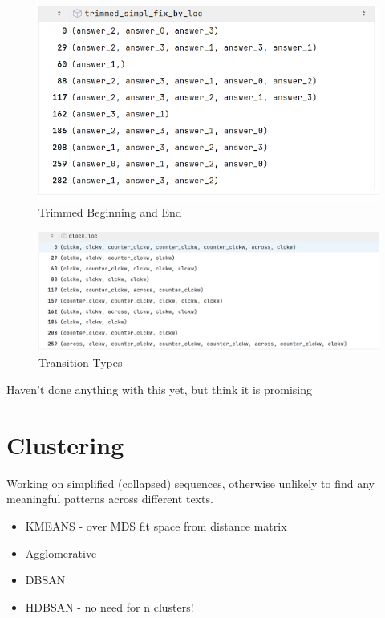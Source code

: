 \documentclass{article}
\begin{document}
\begin{figure}[H]
    \centering
    \includegraphics[width=1\linewidth]{plots/etc/trim_top_and_bottom.PNG}
    \caption{Trimmed Beginning and End}
    \label{fig:enter-label}
\end{figure}

\begin{figure}[H]
    \centering
    \includegraphics[width=1\linewidth]{plots/etc/clock.PNG}
    \caption{Transition Types}
    \label{fig:enter-label}
\end{figure}
Haven't done anything with this yet, but think it is promising

\section{Clustering}

Working on simplified (collapsed) sequences, otherwise unlikely to find any meaningful patterns across different texts.

\begin{itemize}
    \item KMEANS - over MDS fit space from distance matrix
    \item Agglomerative
    \item DBSAN
    \item HDBSAN - no need for n clusters!
\end{itemize}
\end{document}

